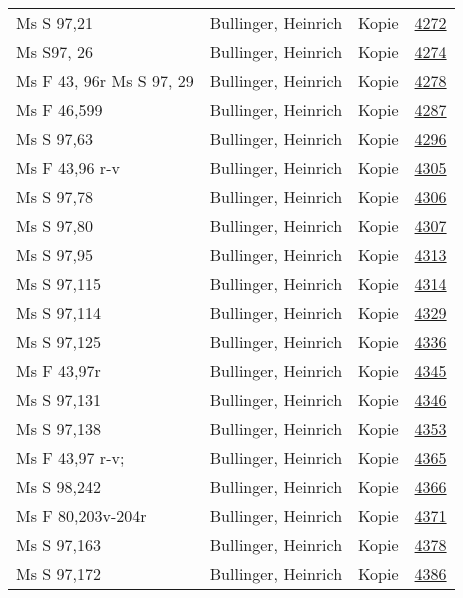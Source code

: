 \documentclass[10pt,a4paper,landscape]{report}
\begin{document}
\begin{longtable}{p{16cm}p{4cm}lr}
Ms S 97,21	&	Bullinger, Heinrich	&	Kopie	&	\href{http://130.60.24.72/assignment/4272}{4272}\\
Ms S97, 26	&	Bullinger, Heinrich	&	Kopie	&	\href{http://130.60.24.72/assignment/4274}{4274}\\
Ms F 43, 96r  Ms S 97, 29	&	Bullinger, Heinrich	&	Kopie	&	\href{http://130.60.24.72/assignment/4278}{4278}\\
Ms F 46,599	&	Bullinger, Heinrich	&	Kopie	&	\href{http://130.60.24.72/assignment/4287}{4287}\\
Ms S 97,63	&	Bullinger, Heinrich	&	Kopie	&	\href{http://130.60.24.72/assignment/4296}{4296}\\
Ms F 43,96 r-v	&	Bullinger, Heinrich	&	Kopie	&	\href{http://130.60.24.72/assignment/4305}{4305}\\
Ms S 97,78	&	Bullinger, Heinrich	&	Kopie	&	\href{http://130.60.24.72/assignment/4306}{4306}\\
Ms S 97,80	&	Bullinger, Heinrich	&	Kopie	&	\href{http://130.60.24.72/assignment/4307}{4307}\\
Ms S 97,95	&	Bullinger, Heinrich	&	Kopie	&	\href{http://130.60.24.72/assignment/4313}{4313}\\
Ms S 97,115	&	Bullinger, Heinrich	&	Kopie	&	\href{http://130.60.24.72/assignment/4314}{4314}\\
Ms S 97,114	&	Bullinger, Heinrich	&	Kopie	&	\href{http://130.60.24.72/assignment/4329}{4329}\\
Ms S 97,125	&	Bullinger, Heinrich	&	Kopie	&	\href{http://130.60.24.72/assignment/4336}{4336}\\
Ms F 43,97r	&	Bullinger, Heinrich	&	Kopie	&	\href{http://130.60.24.72/assignment/4345}{4345}\\
Ms S 97,131	&	Bullinger, Heinrich	&	Kopie	&	\href{http://130.60.24.72/assignment/4346}{4346}\\
Ms S 97,138	&	Bullinger, Heinrich	&	Kopie	&	\href{http://130.60.24.72/assignment/4353}{4353}\\
Ms F 43,97 r-v;	&	Bullinger, Heinrich	&	Kopie	&	\href{http://130.60.24.72/assignment/4365}{4365}\\
Ms S 98,242	&	Bullinger, Heinrich	&	Kopie	&	\href{http://130.60.24.72/assignment/4366}{4366}\\
Ms F 80,203v-204r	&	Bullinger, Heinrich	&	Kopie	&	\href{http://130.60.24.72/assignment/4371}{4371}\\
Ms S 97,163	&	Bullinger, Heinrich	&	Kopie	&	\href{http://130.60.24.72/assignment/4378}{4378}\\
Ms S 97,172	&	Bullinger, Heinrich	&	Kopie	&	\href{http://130.60.24.72/assignment/4386}{4386}\\

\end{longtable}
\end{document}
